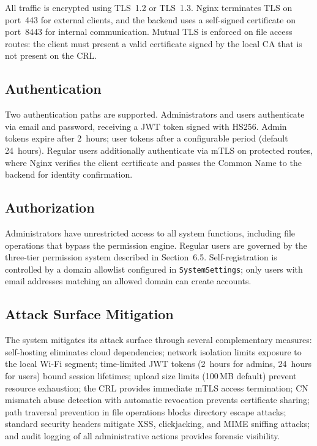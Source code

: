 \documentclass[12pt,letterpaper]{report}
\begin{document}
All traffic is encrypted using TLS~1.2 or TLS~1.3. Nginx terminates TLS on port~443 for external clients, and the backend uses a self-signed certificate on port~8443 for internal communication. Mutual TLS is enforced on file access routes: the client must present a valid certificate signed by the local CA that is not present on the CRL.

\subsection{Authentication}

Two authentication paths are supported. Administrators and users authenticate via email and password, receiving a JWT token signed with HS256. Admin tokens expire after 2~hours; user tokens after a configurable period (default 24~hours). Regular users additionally authenticate via mTLS on protected routes, where Nginx verifies the client certificate and passes the Common Name to the backend for identity confirmation.

\subsection{Authorization}

Administrators have unrestricted access to all system functions, including file operations that bypass the permission engine. Regular users are governed by the three-tier permission system described in Section~6.5. Self-registration is controlled by a domain allowlist configured in \texttt{SystemSettings}; only users with email addresses matching an allowed domain can create accounts.

\subsection{Attack Surface Mitigation}

The system mitigates its attack surface through several complementary measures: self-hosting eliminates cloud dependencies; network isolation limits exposure to the local Wi-Fi segment; time-limited JWT tokens (2~hours for admins, 24~hours for users) bound session lifetimes; upload size limits (100\,MB default) prevent resource exhaustion; the CRL provides immediate mTLS access termination; CN mismatch abuse detection with automatic revocation prevents certificate sharing; path traversal prevention in file operations blocks directory escape attacks; standard security headers mitigate XSS, clickjacking, and MIME sniffing attacks; and audit logging of all administrative actions provides forensic visibility.
\end{document}
